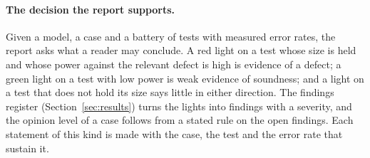 \paragraph{The decision the report supports.} Given a model, a case and a battery of tests with measured error rates, the report asks what a reader may conclude. A red
light on a test whose size is held and whose power against the relevant defect is high is evidence of a defect; a green light on a test with low power is
weak evidence of soundness; and a light on a test that does not hold its size says little in either direction. The findings register (Section~\ref{sec:results}) turns
the lights into findings with a severity, and the opinion level of a case follows from a stated rule on the open findings. Each statement of this kind is made with the
case, the test and the error rate that sustain it.
